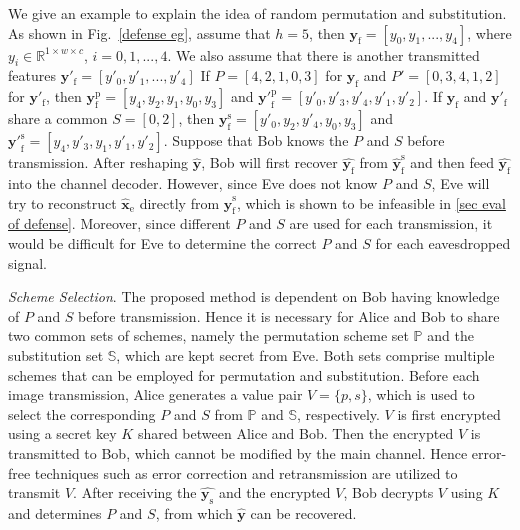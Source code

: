 \documentclass[conference]{IEEEtran}
\begin{document}
We give an example to explain the idea of random permutation and substitution. As shown in Fig.~\ref{defense eg}, assume that $h = 5$, then $\boldsymbol{y}_\mathrm{f} = [y_0, y_1, ..., y_4]$, where $y_i \in \mathbb{R}^{1 \times w \times c}$, $i=0,1,...,4$. We also assume that there is another transmitted features $\boldsymbol{y}'_\mathrm{f} = [y'_0, y'_1, ..., y'_4]$  If $P=[4,2,1,0,3]$ for $\boldsymbol{y}_\mathrm{f}$ and $P'=[0,3,4,1,2]$ for $\boldsymbol{y}'_\mathrm{f}$, then $\boldsymbol{y}^\mathrm{p}_\mathrm{f} = [y_4, y_2, y_1, y_0, y_3]$ and ${\boldsymbol{y}'}^\mathrm{p}_\mathrm{f} = [y'_0, y'_3, y'_4, y'_1, y'_2]$. If $\boldsymbol{y}_\mathrm{f}$ and $\boldsymbol{y}'_\mathrm{f}$ share a common $S=[0,2]$, then $\boldsymbol{y}^\mathrm{s}_\mathrm{f} = [y'_0, y_2, y'_4, y_0, y_3]$ and ${\boldsymbol{y}'}^\mathrm{s}_\mathrm{f} = [y_4, y'_3, y_1, y'_1, y'_2]$. Suppose that Bob knows the $P$ and $S$ before transmission. After reshaping $\hat{\boldsymbol{y}}$, Bob will first recover $\hat{\boldsymbol{y}_\mathrm{f}}$ from $\hat{\boldsymbol{y}}^\mathrm{s}_\mathrm{f}$ and then feed $\hat{\boldsymbol{y}_\mathrm{f}}$ into the channel decoder. However, since Eve does not know $P$ and $S$, Eve will try to reconstruct $\hat{\boldsymbol{x}}_\mathrm{e}$ directly from $\hat{\boldsymbol{y}}^\mathrm{s}_\mathrm{f}$, which is shown to be infeasible in \ref{sec eval of defense}. Moreover, since different $P$ and $S$ are used for each transmission, it would be difficult for Eve to determine the correct $P$ and $S$ for each eavesdropped signal. 


\emph{Scheme Selection}. The proposed method is dependent on Bob having knowledge of $P$ and $S$ before transmission. Hence it is necessary for Alice and Bob to share two common sets of schemes, namely the permutation scheme set $\mathbb{P}$ and the substitution set $\mathbb{S}$, which are kept secret from Eve. Both sets comprise multiple schemes that can be employed for permutation and substitution. Before each image transmission, Alice generates a value pair $V = \{p, s\}$, which is used to select the corresponding $P$ and $S$ from $\mathbb{P}$ and $\mathbb{S}$, respectively. $V$ is first encrypted using a secret key $K$ shared between Alice and Bob. Then the encrypted $V$ is transmitted to Bob, which cannot be modified by the main channel. Hence error-free techniques such as error correction and retransmission are utilized to transmit $V$. After receiving the $\hat{\boldsymbol{y}_\mathrm{s}}$ and the encrypted $V$, Bob decrypts $V$ using $K$ and determines $P$ and $S$, from which $\hat{\boldsymbol{y}}$ can be recovered. 
\end{document}
